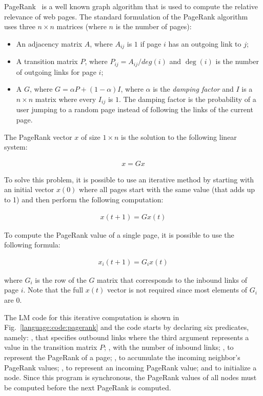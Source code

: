 PageRank~\cite{Page:2001:MNR} is a well known graph algorithm that is used to
compute the relative relevance of web pages. The standard formulation of the
PageRank algorithm uses three $n \times n$ matrices (where $n$ is the number of
pages):

\begin{itemize}

   \item An adjacency matrix $A$, where $A_{ij}$ is $1$ if page $i$ has an
      outgoing link to $j$;

   \item A transition matrix $P$, where $P_{ij} = A_{ij}/deg(i)$ and $\deg(i)$
      is the number of outgoing links for page $i$;

   \item A  $G$, where $G = \alpha P + (1-\alpha)I$, where
      $\alpha$ is the \emph{damping factor} and $I$ is a $n \times n$ matrix
      where every $I_{ij}$ is $1$. The damping factor is the probability of a user
      jumping to a random page instead of following the links of the current
      page.

\end{itemize}

The PageRank vector $x$ of size $1 \times n$ is the solution to the following
linear system:

\begin{align}
x = G x
\end{align}

To solve this problem, it is possible to use an iterative method by starting
with an initial vector $x(0)$ where all pages start with the same value (that
adds up to 1) and then perform the following computation:

\begin{align}
x(t + 1) = G x(t)
\end{align}

To compute the PageRank value of a single page, it is possible to use the
following formula:

\begin{align}
x_{i}(t + 1) = G_{i} x(t)\label{eq:language:pagerank}
\end{align}

\noindent where $G_{i}$ is the row of the $G$ matrix that corresponds to the
inbound links of page $i$. Note that the full $x(t)$ vector is not required
since most elements of $G_{i}$ are $0$.

The LM code for this iterative computation is shown in
Fig.~\ref{language:code:pagerank} and the code starts by declaring six
predicates, namely: , that specifies outbound links where the
third argument represents a value in the transition matrix $P$;
, with the number of inbound links; , to
represent the PageRank of a page; , to accumulate the incoming
neighbor's PageRank values; , to represent an incoming
PageRank value; and  to initialize a node.  Since this program is
synchronous, the PageRank values of all nodes must be computed before the next
PageRank is computed.

